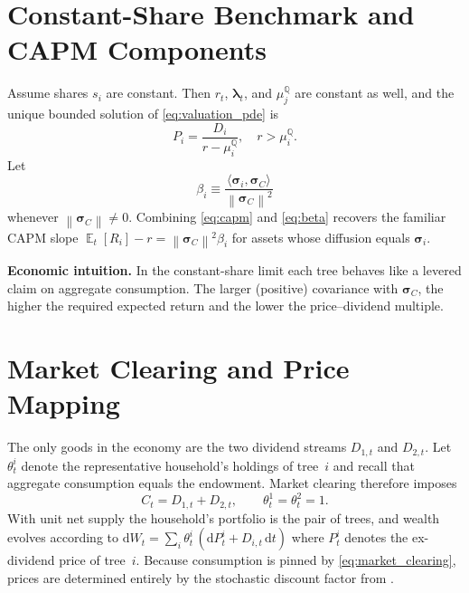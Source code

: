 ﻿\documentclass[11pt,letterpaper,oneside]{article}
\numberwithin{equation}{section}
\DeclareMathOperator{\E}{\mathbb{E}}
\newcommand{\1}{\mathbf{1}}
\newcommand{\diff}{\mathrm{d}}
\newcommand{\ip}[2]{\langle #1,#2\rangle}
\newcommand{\norm}[1]{\left\lVert #1\right\rVert}
\begin{document}
\section{Constant-Share Benchmark and CAPM Components}\label{sec:benchmark}
Assume shares $s_i$ are constant. Then $r_t$, $\bm{\lambda}_t$, and $\mu_j^{\mathbb{Q}}$ are constant as well, and the unique bounded solution of \eqref{eq:valuation_pde} is
\begin{equation}\label{eq:const_share_solution}
  P_i = \frac{D_i}{r - \mu_i^{\mathbb{Q}}}, \quad r > \mu_i^{\mathbb{Q}}.
\end{equation}
Let
\begin{equation}\label{eq:beta}
  \beta_i \equiv \frac{\ip{\bm{\sigma}_i}{\bm{\sigma}_C}}{\norm{\bm{\sigma}_C}^2}
\end{equation}
whenever $\norm{\bm{\sigma}_C} \neq 0$. Combining \eqref{eq:capm} and \eqref{eq:beta} recovers the familiar CAPM slope $\E_t[R_i]-r = \norm{\bm{\sigma}_C}^2 \beta_i$ for assets whose diffusion equals $\bm{\sigma}_i$.

\begin{tcolorbox}[didacticstyle]
\textbf{Economic intuition.} In the constant-share limit each tree behaves like a levered claim on aggregate consumption. The larger (positive) covariance with $\bm{\sigma}_C$, the higher the required expected return and the lower the price--dividend multiple.
\end{tcolorbox}

\section{Market Clearing and Price Mapping}
The only goods in the economy are the two dividend streams $D_{1,t}$ and $D_{2,t}$. Let $\theta^i_t$ denote the representative household's holdings of tree~$i$ and recall that aggregate consumption equals the endowment. Market clearing therefore imposes
\begin{equation}\label{eq:market_clearing}
  C_t = D_{1,t}+D_{2,t},\qquad \theta^1_t = \theta^2_t = 1.
\end{equation}
With unit net supply the household's portfolio is the pair of trees, and wealth evolves according to $\diff W_t = \sum_i \theta^i_t\,(\diff P^i_t + D_{i,t}\,\diff t)$ where $P^i_t$ denotes the ex-dividend price of tree~$i$. Because consumption is pinned by \eqref{eq:market_clearing}, prices are determined entirely by the stochastic discount factor from .
\end{document}
